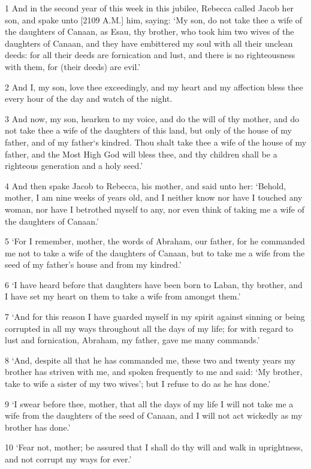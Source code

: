 \par 1 And in the second year of this week in this jubilee, Rebecca called Jacob her son, and spake unto [2109 A.M.] him, saying: ‘My son, do not take thee a wife of the daughters of Canaan, as Esau, thy brother, who took him two wives of the daughters of Canaan, and they have embittered my soul with all their unclean deeds: for all their deeds are fornication and lust, and there is no righteousness with them, for (their deeds) are evil.’
\par 2 And I, my son, love thee exceedingly, and my heart and my affection bless thee every hour of the day and watch of the night.
\par 3 And now, my son, hearken to my voice, and do the will of thy mother, and do not take thee a wife of the daughters of this land, but only of the house of my father, and of my father‘s kindred. Thou shalt take thee a wife of the house of my father, and the Most High God will bless thee, and thy children shall be a righteous generation and a holy seed.’
\par 4 And then spake Jacob to Rebecca, his mother, and said unto her: ‘Behold, mother, I am nine weeks of years old, and I neither know nor have I touched any woman, nor have I betrothed myself to any, nor even think of taking me a wife of the daughters of Canaan.’
\par 5 ‘For I remember, mother, the words of Abraham, our father, for he commanded me not to take a wife of the daughters of Canaan, but to take me a wife from the seed of my father's house and from my kindred.’
\par 6 ‘I have heard before that daughters have been born to Laban, thy brother, and I have set my heart on them to take a wife from amongst them.’
\par 7 ‘And for this reason I have guarded myself in my spirit against sinning or being corrupted in all my ways throughout all the days of my life; for with regard to lust and fornication, Abraham, my father, gave me many commands.’
\par 8 ‘And, despite all that he has commanded me, these two and twenty years my brother has striven with me, and spoken frequently to me and said: ‘My brother, take to wife a sister of my two wives’; but I refuse to do as he has done.’
\par 9 ‘I swear before thee, mother, that all the days of my life I will not take me a wife from the daughters of the seed of Canaan, and I will not act wickedly as my brother has done.’
\par 10 ‘Fear not, mother; be assured that I shall do thy will and walk in uprightness, and not corrupt my ways for ever.’
